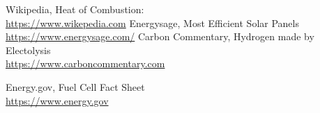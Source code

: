 \documentclass[aps,prl,reprint]{revtex4-2}
\begin{document}
\begin{thebibliography}{9}
%
Wikipedia, Heat of Combustion: \\
\href{https://en.wikipedia.org/wiki/Heat_of_combustion}{https://www.wikepedia.com}
%
Energysage, Most Efficient Solar Panels\\
\href{https://news.energysage.com/what-are-the-most-efficient-solar-panels-on-the-market/#:~:text=How%20efficient%20are%20solar%20panels,are%20not%20above%2020%25%20efficiency.}{https://www.energysage.com/}
%
Carbon Commentary, Hydrogen made by Electolysis\\
\href{https://www.carboncommentary.com/blog/2017/7/5/hydrogen-made-by-the-electrolysis-of-water-is-now-cost-competitive-and-gives-us-another-building-block-for-the-low-carbon-economy}{https://www.carboncommentary.com}
%

%
Energy.gov, Fuel Cell Fact Sheet\\
\href{https://www.energy.gov/sites/prod/files/2015/11/f27/fcto_fuel_cells_fact_sheet.pdf}{https://www.energy.gov}

\end{thebibliography}
\end{document}
